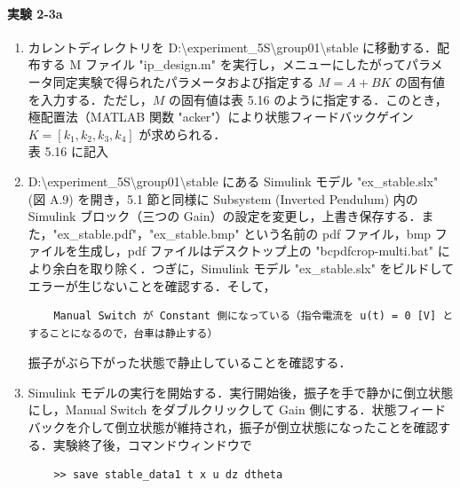 \paragraph{実験 2-3a}
\begin{enumerate}
  \item カレントディレクトリを D:\textbackslash experiment\_5S\textbackslash group01\textbackslash stable に移動する．配布する M ファイル "ip\_design.m" を実行し，メニューにしたがってパラメータ同定実験で得られたパラメータおよび指定する \( M = A + BK \) の固有値を入力する．ただし，\( M \) の固有値は表 5.16 のように指定する．このとき，極配置法（MATLAB 関数 "acker"）により状態フィードバックゲイン \( K = [k_1, k_2, k_3, k_4] \) が求められる．\\
        表 5.16 に記入
        
  \item D:\textbackslash experiment\_5S\textbackslash group01\textbackslash stable にある Simulink モデル "ex\_stable.slx" (図 A.9) を開き，5.1 節と同様に Subsystem (Inverted Pendulum) 内の Simulink ブロック（三つの Gain）の設定を変更し，上書き保存する．また，"ex\_stable.pdf"，"ex\_stable.bmp" という名前の pdf ファイル，bmp ファイルを生成し，pdf ファイルはデスクトップ上の "bcpdfcrop-multi.bat" により余白を取り除く．つぎに，Simulink モデル "ex\_stable.slx" をビルドしてエラーが生じないことを確認する．そして，
        
        \begin{tcolorbox}[colback=gray!5!white,colframe=gray!75!black]
          \begin{lstlisting}
    Manual Switch が Constant 側になっている（指令電流を u(t) = 0 [V] とすることになるので，台車は静止する）
    \end{lstlisting}
        \end{tcolorbox}
        
        振子がぶら下がった状態で静止していることを確認する．
        
  \item Simulink モデルの実行を開始する．実行開始後，振子を手で静かに倒立状態にし，Manual Switch をダブルクリックして Gain 側にする．状態フィードバックを介して倒立状態が維持され，振子が倒立状態になったことを確認する．実験終了後，コマンドウィンドウで
        
        \begin{tcolorbox}[colback=gray!5!white,colframe=gray!75!black]
          \begin{lstlisting}
    >> save stable_data1 t x u dz dtheta
    \end{lstlisting}
        \end{tcolorbox}
        

\end{enumerate}
